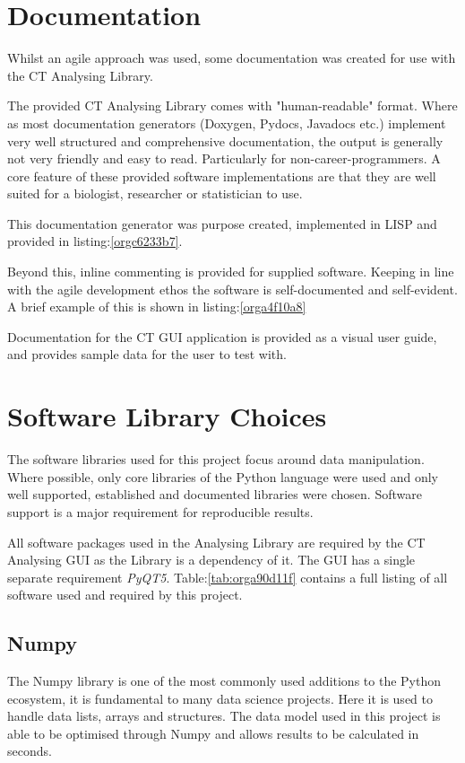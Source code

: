 \documentclass[11pt]{report}
\begin{document}
\section{Documentation}
\label{sec:org7a4120a}
Whilst an agile approach was used, some documentation was created for use with the CT Analysing Library.

The provided CT Analysing Library comes with "human-readable" format. Where as most documentation generators (Doxygen, Pydocs, Javadocs etc.) implement very well structured and comprehensive documentation, the output is generally not very friendly and easy to read. Particularly for non-career-programmers. A core feature of these provided software implementations are that they are well suited for a biologist, researcher or statistician to use.

This documentation generator was purpose created, implemented in LISP and provided in listing:\ref{orgc6233b7}.

Beyond this, inline commenting is provided for supplied software. Keeping in line with the agile development ethos the software is self-documented and self-evident. A brief example of this is shown in listing:\ref{orga4f10a8}

Documentation for the CT GUI application is provided as a visual user guide, and provides sample data for the user to test with.
\section{Software Library Choices}
\label{sec:org3098f65}
The software libraries used for this project focus around data manipulation. Where possible, only core libraries of the Python language were used and only well supported, established and documented libraries were chosen. Software support is a major requirement for reproducible results.

All software packages used in the Analysing Library are required by the CT Analysing GUI as the Library is a dependency of it. The GUI has a single separate requirement \emph{PyQT5}.
Table:\ref{tab:orga90d11f} contains a full listing of all software used and required by this project.
\subsection{Numpy}
\label{sec:org81b70af}
The Numpy library is one of the most commonly used additions to the Python ecosystem, it is fundamental to many data science projects. Here it is used to handle data lists, arrays and structures. The data model used in this project is able to be optimised through Numpy and allows results to be calculated in seconds.
\end{document}
